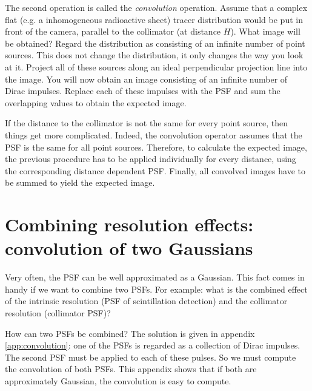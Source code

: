 \documentclass[11pt,oneside]{book}
\begin{document}
The second operation is called the {\em convolution} operation. Assume that a
complex flat (e.g. a inhomogeneous radioactive sheet) tracer distribution
would be put in front of the camera, parallel to the collimator (at distance
$H$). What image will be obtained?  Regard the distribution as consisting of
an infinite number of point sources. This does not change the distribution, it
only changes the way you look at it. Project all of these sources along an
ideal perpendicular projection line into the image. You will now obtain an
image consisting of an infinite number of Dirac impulses. Replace each of
these impulses with the PSF and sum the overlapping values to obtain the
expected image.

If the distance to the collimator is not the same for every point source, then
things get more complicated. Indeed, the convolution operator assumes that the
PSF is the same for all point sources. Therefore, to calculate the expected
image, the previous procedure has to be applied individually for every
distance, using the corresponding distance dependent PSF. Finally, all
convolved images have to be summed to yield the expected image.

\newpage
\section{Combining resolution effects: convolution of two Gaussians} \label{app:convol2gauss}
Very often, the PSF can be well approximated as a Gaussian. This fact comes in
handy if we want to combine two PSFs. For example: what is the combined effect
of the intrinsic resolution (PSF of scintillation detection) and the collimator
resolution (collimator PSF)?

How can two PSFs be combined? The solution is given in appendix
\ref{app:convolution}: one of the PSFs is regarded as a collection of Dirac
impulses. The second PSF must be applied to each of these pulses. So we must
compute the convolution of both PSFs. This appendix shows that if both are
approximately Gaussian, the convolution is easy to compute.
\end{document}
